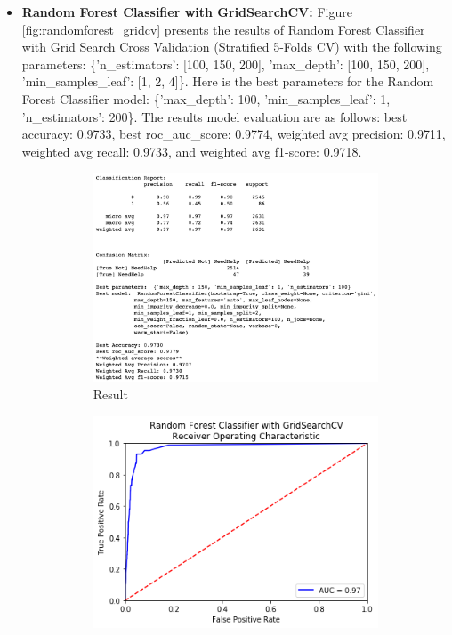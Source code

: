 \documentclass[11pt]{article}
\begin{document}
\begin{itemize}
\item \textbf{Random Forest Classifier with GridSearchCV:}
Figure \ref{fig:randomforest_gridcv} presents 
the results of Random Forest Classifier with Grid Search Cross Validation (Stratified 5-Folds CV) with the following 
parameters: \{'n\_estimators': [100, 150, 200], 'max\_depth': [100, 150, 200], 'min\_samples\_leaf': [1, 2, 4]\}.
%
Here is the best parameters for the Random Forest Classifier model: 
\{'max\_depth': 100, 'min\_samples\_leaf': 1, 'n\_estimators': 200\}.
%
The results model evaluation are as follows:
best accuracy: 0.9733,
best roc\_auc\_score: 0.9774,
weighted avg precision: 0.9711,
weighted avg recall: 0.9733, and
weighted avg f1-score: 0.9718.
%
\begin{figure}[h]
\centering
\begin{subfigure}{0.6\textwidth}
         \centering
         \includegraphics[width=\textwidth]{randomforest_gridcv.png}
         \caption{Result}
         \label{fig:randomforest_gridcv_report}
\end{subfigure}
\hfill
\begin{subfigure}{0.38\textwidth}
         \centering
         \includegraphics[width=\textwidth]{randomforest_gridcv_auc.png}

\end{subfigure}
\end{figure}
\end{itemize}
\end{document}
